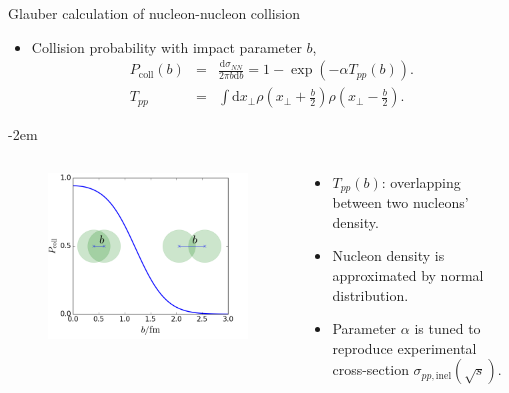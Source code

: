 \documentclass[11pt]{beamer}
\begin{document}
\begin{frame}{Glauber calculation of nucleon-nucleon collision}
\begin{itemize}
\item Collision probability with impact parameter $b$,
\begin{eqnarray}\label{dsigma_db}
\nonumber
		P_{\textrm{coll}}(b) &=& \frac{\mathrm{d}\sigma_{NN}}{2\pi b \mathrm{d}b} = 1 - \exp\left(-\alpha T_{pp} (b)\right). \\
		\nonumber
		T_{pp} &=& \int \mathrm{d}x_\perp \rho\left(x_\perp + \frac{b}{2}\right) \rho\left(x_\perp - \frac{b}{2}\right).
\end{eqnarray}
\end{itemize}
\kern-2em
\begin{columns}[onlytextwidth]
  \begin{column}{0.4\textwidth}
    \begin{figure}
	\begin{center}
	\includegraphics[width = \textwidth]{./pics/Pcoll.png}
	\end{center}
	\end{figure}
  \end{column}
  \begin{column}{0.6\textwidth}
  \begin{itemize}
  	\item $T_{pp}(b)$: overlapping between two nucleons' density.
  	\item Nucleon density is approximated by normal distribution.
  	\item Parameter $\alpha$ is tuned to reproduce experimental cross-section $\sigma_{pp, \textrm{inel}}(\sqrt{s})$.
  \end{itemize}
  \end{column}
\end{columns}
\end{frame}
\end{document}
